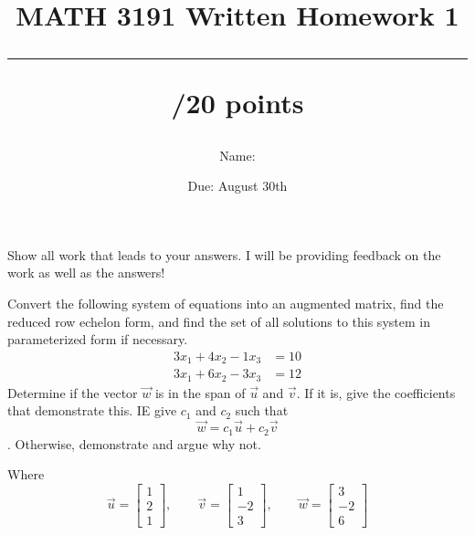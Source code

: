 \documentclass{exam}
\title{MATH 3191 Written Homework 1\\\rule{30pt}{1pt}/20 points}
\author{Name: \rule{150pt}{1pt}}
\date{Due: August 30th}
\begin{document}
\maketitle
Show all work that leads to your answers. I will be providing feedback on the work as well as the answers!
\begin{questions}
    \question[10] Convert the following system of equations into an augmented matrix, find the
    reduced row echelon form, and find the set of all solutions to this system in parameterized form
    if necessary.
    \begin{align*}
        3x_1 + 4x_2 - 1x_3 &= 10 \\
        3x_1 + 6x_2 - 3x_3 &= 12
    \end{align*}
    \newpage
    \question[10] Determine if the vector $\vec{w}$ is in the span of $\vec{u}$ and $\vec{v}$. If
    it is, give the coefficients that demonstrate this. IE give $c_1$ and $c_2$ such that
    $$\vec{w} = c_1\vec{u} + c_2\vec{v}$$. Otherwise, demonstrate and argue why not.

    Where
    \[
        \vec{u} = \begin{bmatrix}
            1 \\
            2 \\
            1
        \end{bmatrix},\qquad
        \vec{v} = \begin{bmatrix}
            1 \\
            -2 \\
            3
        \end{bmatrix},\qquad
        \vec{w} = \begin{bmatrix}
            3 \\
            -2\\
            6
        \end{bmatrix}
    \]
\end{questions}
\end{document}
